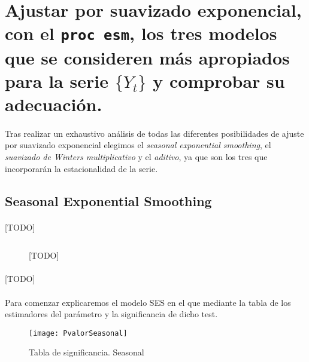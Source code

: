 \documentclass[a4paper, spanish]{article}
\begin{document}
  \section{Ajustar por suavizado exponencial, con el \texttt{proc esm}, los tres modelos que se consideren más apropiados para la serie $\{Y_t\}$ y comprobar su adecuación.}
  \label{sec:b}

    \paragraph{}
    Tras realizar un exhaustivo análisis de todas las diferentes posibilidades de ajuste por suavizado exponencial elegimos el \textit{seasonal exponential smoothing}, el \textit{suavizado de Winters multiplicativo} y el \textit{aditivo}, ya que son los tres que incorporarán la estacionalidad de la serie.\\

    \subsection{Seasonal Exponential Smoothing}

      \paragraph{}
      [TODO]

      \begin{figure}[h]
        \centering
        \inputminted{SAS}{./res/code/b-01-esm-1.sas}
        \caption{[TODO]}
        \label{code:b_esm_1}
      \end{figure}

      \paragraph{}
      [TODO]

      \paragraph{}
      Para comenzar explicaremos el modelo SES en el que mediante la tabla de los estimadores del parámetro y la significancia de dicho test.

      \begin{figure}[h]
        \centering
        \texttt{[image: PvalorSeasonal]}
        \caption{Tabla de significancia. Seasonal}
        \label{}
      \end{figure}
\end{document}
